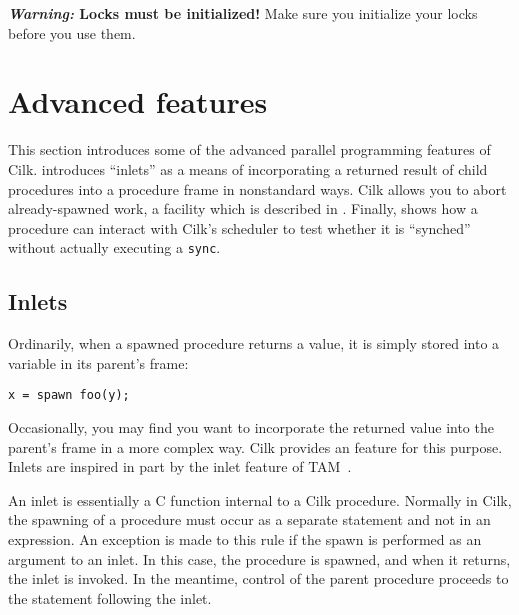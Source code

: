 \textbf{\textit{Warning:} Locks must be initialized!}  Make sure you
initialize your locks before you use them.



\section{Advanced features}
\label{sec:advanced}

This section introduces some of the advanced parallel programming
features of Cilk.   introduces ``inlets'' as a means of
incorporating a returned result of child procedures into a procedure
frame in nonstandard ways.  Cilk allows you to abort already-spawned
work, a facility which is described in .
Finally,  shows how a procedure can interact with Cilk's
scheduler to test whether it is ``synched'' without actually executing
a \texttt{sync}. 


\subsection{Inlets}
\label{sec:inlets}

Ordinarily, when a spawned procedure returns a value, it is simply
stored into a variable in its parent's frame:
\begin{verbatim}
x = spawn foo(y);
\end{verbatim}
Occasionally, you may find you want to incorporate the returned value
into the parent's frame in a more complex way.  Cilk provides an
 feature for this purpose. Inlets are
inspired in part by the inlet feature of TAM~\cite{CullerSaSc91}.

An inlet is essentially a C function internal to a Cilk procedure.
Normally in Cilk, the spawning of a procedure must occur as a
separate statement and not in an expression.  An exception is made to
this rule if the spawn is performed as an argument to an inlet.  In
this case, the procedure is spawned, and when it returns, the inlet
is invoked.  In the meantime, control of the parent procedure proceeds
to the statement following the inlet.

